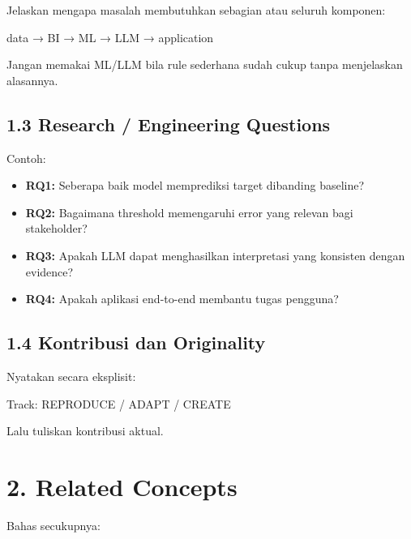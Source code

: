 \documentclass[
  indonesian,
  letterpaper,
  DIV=11,
  numbers=noendperiod]{scrreprt}
\newenvironment{Shaded}{\begin{snugshade}}{\end{snugshade}}
\newcommand{\NormalTok}[1]{\textcolor[rgb]{0.00,0.23,0.31}{#1}}
\providecommand{\tightlist}{%
  \setlength{\itemsep}{0pt}\setlength{\parskip}{0pt}}
\begin{document}
Jelaskan mengapa masalah membutuhkan sebagian atau seluruh komponen:

\begin{Shaded}
\begin{Highlighting}[]
\NormalTok{data → BI → ML → LLM → application}
\end{Highlighting}
\end{Shaded}

Jangan memakai ML/LLM bila rule sederhana sudah cukup tanpa menjelaskan
alasannya.

\section{1.3 Research / Engineering
Questions}\label{research-engineering-questions}

Contoh:

\begin{itemize}
\tightlist
\item
  \textbf{RQ1:} Seberapa baik model memprediksi target dibanding
  baseline?
\item
  \textbf{RQ2:} Bagaimana threshold memengaruhi error yang relevan bagi
  stakeholder?
\item
  \textbf{RQ3:} Apakah LLM dapat menghasilkan interpretasi yang
  konsisten dengan evidence?
\item
  \textbf{RQ4:} Apakah aplikasi end-to-end membantu tugas pengguna?
\end{itemize}

\section{1.4 Kontribusi dan
Originality}\label{kontribusi-dan-originality}

Nyatakan secara eksplisit:

\begin{Shaded}
\begin{Highlighting}[]
\NormalTok{Track: REPRODUCE / ADAPT / CREATE}
\end{Highlighting}
\end{Shaded}

Lalu tuliskan kontribusi aktual.

\chapter{2. Related Concepts}\label{related-concepts}

Bahas secukupnya:
\end{document}
